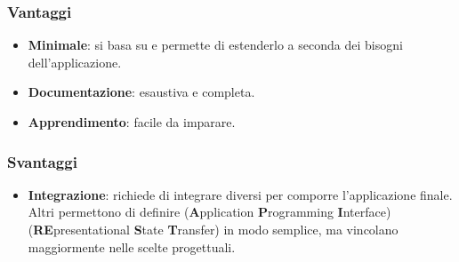\subsubsection{Vantaggi}
\begin{itemize}
\item \textbf{Minimale}: si basa su  e permette di estenderlo a seconda dei bisogni dell'applicazione.
\item \textbf{Documentazione}: esaustiva e completa.
\item \textbf{Apprendimento}: facile da imparare.
\end{itemize}
\subsubsection{Svantaggi}
\begin{itemize} 
\item \textbf{Integrazione}: richiede di integrare  diversi per comporre l'applicazione finale. Altri  permettono di definire  (\textbf{A}pplication \textbf{P}rogramming \textbf{I}nterface)  (\textbf{RE}presentational \textbf{S}tate \textbf{T}ransfer) in modo semplice, ma vincolano maggiormente nelle scelte progettuali.
\end{itemize}

